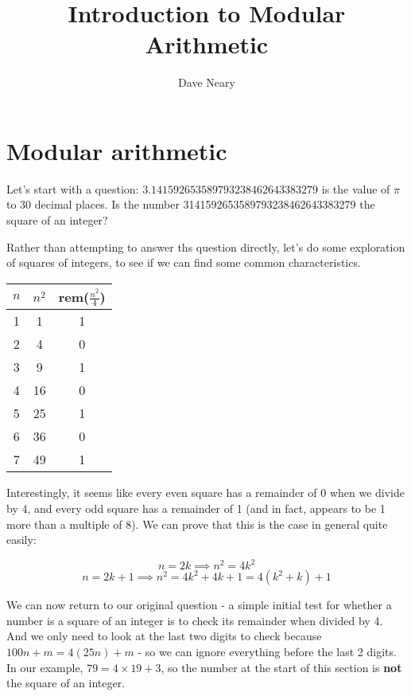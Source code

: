 \documentclass{article}
\begin{document}
\author{Dave Neary}
\title{Introduction to Modular Arithmetic}

\maketitle

\section{Modular arithmetic}

Let's start with a question: $3.141592653589793238462643383279$ is the value of 
$\pi$ to 30 decimal places. Is the number 3141592653589793238462643383279 the
square of an integer?

Rather than attempting to answer ths question directly, let's do some exploration
of squares of integers, to see if we can find some common characteristics.

\begin{table}[htb]
\begin{tabular}{|c|c|c|}
\hline
	$n$ & $n^2$ & rem($\frac{n^2}{4}$) \\   
\hline 
	1 &  1 & 1 \\
	2 &  4 & 0 \\
	3 &  9 & 1 \\
	4 & 16 & 0 \\
	5 & 25 & 1 \\
	6 & 36 & 0 \\
	7 & 49 & 1 \\
\hline 
\end{tabular}
\end{table}

Interestingly, it seems like every even square has a remainder of 0 when we divide
by 4, and every odd square has a remainder of 1 (and in fact, appears to be 1 more than a multiple of 8).
We can prove that this is the case in general quite easily:

\[ n = 2k \implies n^2 = 4k^2 \]
\[ n = 2k+1 \implies n^2 = 4k^2 + 4k + 1 = 4(k^2+k) + 1 \]


We can now return to our original question - a simple initial test for whether a
number is a square of an integer is to check its remainder when divided by 4. And
we only need to look at the last two digits to check because $100n+m =4(25n)+m$ -
so we can ignore everything before the last 2 digits. In our example, 
$79 = 4\times 19 + 3$, so the number at the start of this section is \textbf{not}
the square of an integer.
\end{document}
